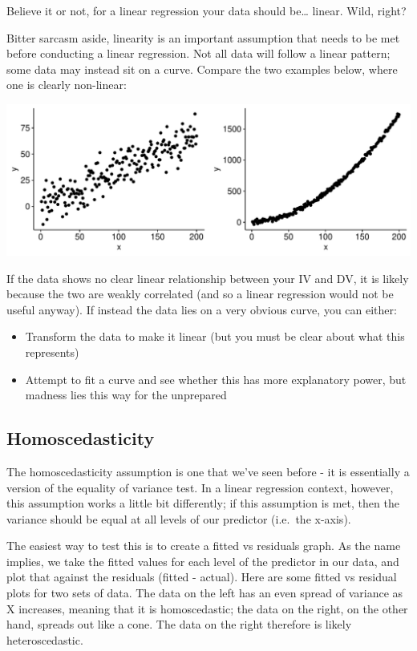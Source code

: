 \documentclass[
]{book}
\providecommand{\tightlist}{%
  \setlength{\itemsep}{0pt}\setlength{\parskip}{0pt}}
\begin{document}
Believe it or not, for a linear regression your data should be\ldots{} linear. Wild, right?

Bitter sarcasm aside, linearity is an important assumption that needs to be met before conducting a linear regression. Not all data will follow a linear pattern; some data may instead sit on a curve. Compare the two examples below, where one is clearly non-linear:

\begin{center}\includegraphics{_main_files/figure-latex/unnamed-chunk-191-1} \end{center}

If the data shows no clear linear relationship between your IV and DV, it is likely because the two are weakly correlated (and so a linear regression would not be useful anyway). If instead the data lies on a very obvious curve, you can either:

\begin{itemize}
\tightlist
\item
  Transform the data to make it linear (but you must be clear about what this represents)
\item
  Attempt to fit a curve and see whether this has more explanatory power, but madness lies this way for the unprepared
\end{itemize}

\hypertarget{homoscedasticity}{%
\subsection{Homoscedasticity}\label{homoscedasticity}}

The homoscedasticity assumption is one that we've seen before - it is essentially a version of the equality of variance test. In a linear regression context, however, this assumption works a little bit differently; if this assumption is met, then the variance should be equal at all levels of our predictor (i.e.~the x-axis).

The easiest way to test this is to create a fitted vs residuals graph. As the name implies, we take the fitted values for each level of the predictor in our data, and plot that against the residuals (fitted - actual). Here are some fitted vs residual plots for two sets of data. The data on the left has an even spread of variance as X increases, meaning that it is homoscedastic; the data on the right, on the other hand, spreads out like a cone. The data on the right therefore is likely heteroscedastic.
\end{document}
